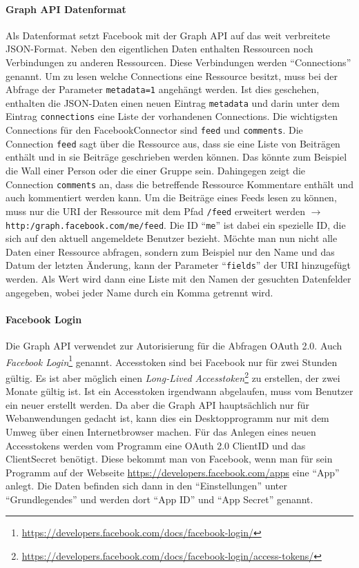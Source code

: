 \paragraph{Graph API Datenformat} %
\label{par:graph_api_datenformat}

Als Datenformat setzt Facebook mit der Graph API auf das weit verbreitete JSON-Format. Neben den eigentlichen Daten enthalten Ressourcen noch Verbindungen zu anderen Ressourcen. Diese Verbindungen werden \enquote{Connections} genannt. Um zu lesen welche Connections eine Ressource besitzt, muss bei der Abfrage der Parameter \texttt{metadata=1} angehängt werden. Ist dies geschehen, enthalten die JSON-Daten einen neuen Eintrag \texttt{metadata} und darin unter dem Eintrag \texttt{connections} eine Liste der vorhandenen Connections. Die wichtigsten Connections für den FacebookConnector sind \texttt{feed} und \texttt{comments}. Die Connection \texttt{feed} sagt über die Ressource aus, dass sie eine Liste von Beiträgen enthält und in sie Beiträge geschrieben werden können. Das könnte zum Beispiel die Wall einer Person oder die einer Gruppe sein. Dahingegen zeigt die Connection \texttt{comments} an, dass die betreffende Ressource Kommentare enthält und auch kommentiert werden kann. Um die Beiträge eines Feeds lesen zu können, muss nur die URI der Ressource mit dem Pfad \texttt{/feed} erweitert werden $\rightarrow$ \texttt{http:/graph.facebook.com/me/feed}. Die ID \enquote{\texttt{me}} ist dabei ein spezielle ID, die sich auf den aktuell angemeldete Benutzer bezieht. Möchte man nun nicht alle Daten einer Ressource abfragen, sondern zum Beispiel nur den Name und das Datum der letzten Änderung, kann der Parameter \enquote{\texttt{fields}} der URI hinzugefügt werden. Als Wert wird dann eine Liste mit den Namen der gesuchten Datenfelder angegeben, wobei jeder Name durch ein Komma getrennt wird. 


\paragraph{Facebook Login} %
\label{par:facebook_login}

Die Graph API verwendet zur Autorisierung für die Abfragen OAuth 2.0. Auch \emph{Facebook Login}\footnote{\url{https://developers.facebook.com/docs/facebook-login/}} genannt. Accesstoken sind bei Facebook nur für zwei Stunden gültig. Es ist aber möglich einen \emph{Long-Lived Accesstoken}\footnote{\url{https://developers.facebook.com/docs/facebook-login/access-tokens/}} zu erstellen, der zwei Monate gültig ist. Ist ein Accesstoken irgendwann abgelaufen, muss vom Benutzer ein neuer erstellt werden. Da aber die Graph API hauptsächlich nur für Webanwendungen gedacht ist, kann dies ein Desktopprogramm nur mit dem Umweg über einen Internetbrowser machen. Für das Anlegen eines neuen Accesstokens werden vom Programm eine OAuth 2.0 ClientID und das ClientSecret benötigt. Diese bekommt man von Facebook, wenn man für sein Programm auf der Webseite \url{https://developers.facebook.com/apps} eine \enquote{App} anlegt. Die Daten befinden sich dann in den \enquote{Einstellungen} unter \enquote{Grundlegendes} und werden dort \enquote{App ID} und \enquote{App Secret} genannt.

